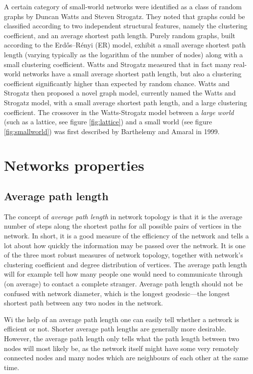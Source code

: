     A certain category of small-world networks were identified as a class of random graphs by Duncan Watts and Steven Strogatz\cite{WattsStrogatz1998}. They noted that graphs could be classified according to two independent structural features, namely the clustering coefficient, and an average shortest path length. Purely random graphs, built according to the Erdős–Rényi (ER) model, exhibit a small average shortest path length (varying typically as the logarithm of the number of nodes) along with a small clustering coefficient\cite{ErdosRenyi1960}. Watts and Strogatz measured that in fact many real-world networks have a small average shortest path length, but also a clustering coefficient significantly higher than expected by random chance. Watts and Strogatz then proposed a novel graph model, currently named the Watts and Strogatz model, with a small average shortest path length, and a large clustering coefficient. The crossover in the Watts-Strogatz model between a \emph{large world} (such as a lattice, see figure \ref{fig:lattice}) and a small world (see figure \ref{fig:smallworld}) was first described by Barthelemy and Amaral in 1999\cite{BarthelemyAmaral1999}.
    
  \section{Networks properties}
  
    \subsection{Average path length}
    
      The concept of \emph{average path length} in network topology is that it is the average number of steps along the shortest paths for all possible pairs of vertices in the network. In short, it is a good measure of the efficiency of the network and tells a lot about how quickly the information may be passed over the network. It is one of the three most robust measures of network topology, together with network's clustering coefficient and degree distribution of vertices. The average path length will for example tell how many people one would need to communicate through (on average) to contact a complete stranger. Average path length should not be confused with network diameter, which is the longest geodesic---the longest shortest path between any two nodes in the network.

      Wi the help of an average path length one can easily tell whether a network is efficient or not. Shorter average path lengths are generally more desirable. However, the average path length only tells what the path length between two nodes will most likely be, as the network itself might have some very remotely connected nodes and many nodes which are neighbours of each other at the same time.
      
